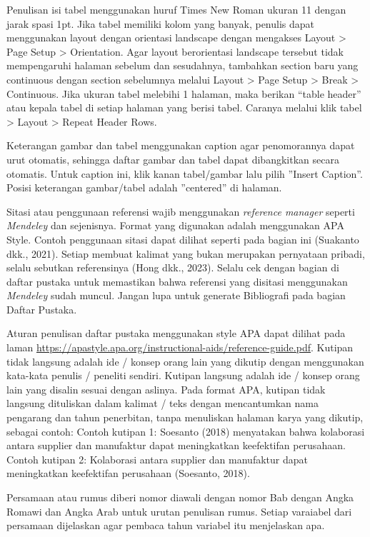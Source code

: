 Penulisan isi tabel menggunakan huruf Times New Roman ukuran 11 dengan
jarak spasi 1pt. Jika tabel memiliki kolom yang banyak, penulis dapat
menggunakan layout dengan orientasi landscape dengan mengakses Layout
\textgreater{} Page Setup \textgreater{} Orientation. Agar layout
berorientasi landscape tersebut tidak mempengaruhi halaman sebelum dan
sesudahnya, tambahkan section baru yang continuous dengan section
sebelumnya melalui Layout \textgreater{} Page Setup \textgreater{} Break
\textgreater{} Continuous. Jika ukuran tabel melebihi 1 halaman, maka
berikan ``table header'' atau kepala tabel di setiap halaman yang berisi
tabel. Caranya melalui klik tabel \textgreater{} Layout \textgreater{}
Repeat Header Rows.

Keterangan gambar dan tabel menggunakan caption agar penomorannya dapat
urut otomatis, sehingga daftar gambar dan tabel dapat dibangkitkan
secara otomatis. Untuk caption ini, klik kanan tabel/gambar lalu pilih
''Insert Caption''. Posisi keterangan gambar/tabel adalah ''centered''
di halaman.

Sitasi atau penggunaan referensi wajib menggunakan \emph{reference
manager} seperti \emph{Mendeley} dan sejenisnya. Format yang digunakan
adalah menggunakan APA Style. Contoh penggunaan sitasi dapat dilihat
seperti pada bagian ini (Suakanto dkk., 2021). Setiap membuat kalimat
yang bukan merupakan pernyataan pribadi, selalu sebutkan referensinya
(Hong dkk., 2023). Selalu cek dengan bagian di daftar pustaka untuk
memastikan bahwa referensi yang disitasi menggunakan \emph{Mendeley}
sudah muncul. Jangan lupa untuk generate Bibliografi pada bagian Daftar
Pustaka.

Aturan penulisan daftar pustaka menggunakan style APA dapat dilihat pada
laman
\url{https://apastyle.apa.org/instructional-aids/reference-guide.pdf}.
Kutipan tidak langsung adalah ide / konsep orang lain yang dikutip
dengan menggunakan kata-kata penulis / peneliti sendiri. Kutipan
langsung adalah ide / konsep orang lain yang disalin sesuai dengan
aslinya. Pada format APA, kutipan tidak langsung dituliskan dalam
kalimat / teks dengan mencantumkan nama pengarang dan tahun penerbitan,
tanpa menuliskan halaman karya yang dikutip, sebagai contoh: Contoh
kutipan 1: Soesanto (2018) menyatakan bahwa kolaborasi antara supplier
dan manufaktur dapat meningkatkan keefektifan perusahaan. Contoh kutipan
2: Kolaborasi antara supplier dan manufaktur dapat meningkatkan
keefektifan perusahaan (Soesanto, 2018).

Persamaan atau rumus diberi nomor diawali dengan nomor Bab dengan Angka
Romawi dan Angka Arab untuk urutan penulisan rumus. Setiap varaiabel
dari persamaan dijelaskan agar pembaca tahun variabel itu menjelaskan
apa.

